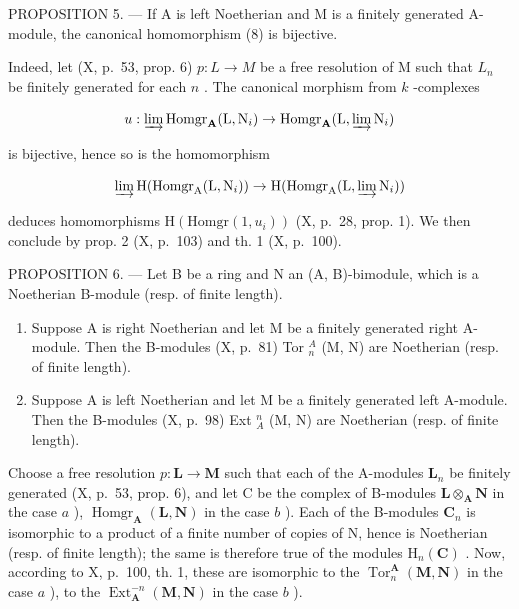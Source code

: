 PROPOSITION 5. --- If A is left Noetherian and M is a finitely generated A-module, the canonical homomorphism (8) is bijective.

Indeed, let (X, p.~53, prop. 6) \(p: L \to M\) be a free resolution of M such that \(L_{n}\) be finitely generated for each \(n\) . The canonical morphism from \(k\) -complexes

\[
u: \varinjlim \operatorname{Homgr} _ {\mathbf {A}} (\mathrm{L}, \mathrm{N} _ {i}) \rightarrow \operatorname{Homgr} _ {\mathbf {A}} (\mathrm{L}, \varinjlim \mathrm{N} _ {i})
\]

is bijective, hence so is the homomorphism

\[
\varinjlim \mathrm{H} (\operatorname{Homgr} _ {\mathrm{A}} (\mathrm{L}, \mathrm{N} _ {i})) \rightarrow \mathrm{H} (\operatorname{Homgr} _ {\mathrm{A}} (\mathrm{L}, \varinjlim \mathrm{N} _ {i}))
\]

deduces homomorphisms \(\mathrm{H}(\mathrm{Homgr}(1,u_{i}))\) (X, p.~28, prop. 1). We then conclude by prop. 2 (X, p.~103) and th. 1 (X, p.~100).

PROPOSITION 6. --- Let B be a ring and N an (A, B)-bimodule, which is a Noetherian B-module (resp. of finite length).

\begin{enumerate}
\def\labelenumi{\alph{enumi})}
\item
  Suppose A is right Noetherian and let M be a finitely generated right A-module. Then the B-modules (X, p.~81) Tor \(_{n}^{A}\) (M, N) are Noetherian (resp. of finite length).
\item
  Suppose A is left Noetherian and let M be a finitely generated left A-module. Then the B-modules (X, p.~98) Ext \(_{A}^{n}\) (M, N) are Noetherian (resp. of finite length).
\end{enumerate}

Choose a free resolution \(p: \mathbf{L} \to \mathbf{M}\) such that each of the A-modules \(\mathbf{L}_n\) be finitely generated (X, p.~53, prop. 6), and let C be the complex of B-modules \(\mathbf{L} \otimes_{\mathbf{A}} \mathbf{N}\) in the case \(a\) ), \(\operatorname{Homgr}_{\mathbf{A}}(\mathbf{L}, \mathbf{N})\) in the case \(b\) ). Each of the B-modules \(\mathbf{C}_n\) is isomorphic to a product of a finite number of copies of N, hence is Noetherian (resp. of finite length); the same is therefore true of the modules \(\mathrm{H}_n(\mathbf{C})\) . Now, according to X, p.~100, th. 1, these are isomorphic to the \(\operatorname{Tor}_n^{\mathbf{A}}(\mathbf{M}, \mathbf{N})\) in the case \(a\) ), to the \(\operatorname{Ext}_{\mathbf{A}}^{-n}(\mathbf{M}, \mathbf{N})\) in the case \(b\) ).

